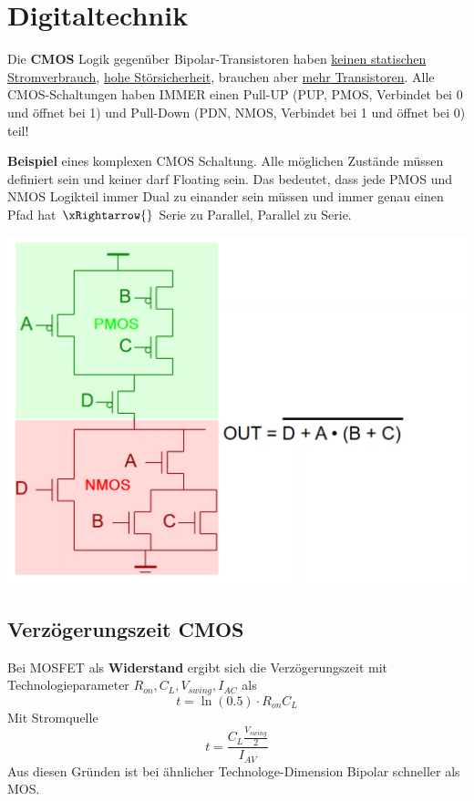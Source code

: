 \section{Digitaltechnik}
Die \textbf{CMOS} Logik gegenüber Bipolar-Transistoren haben \underline{keinen statischen Stromverbrauch}, \underline{hohe Störsicherheit}, brauchen aber \underline{mehr Transistoren}. Alle CMOS-Schaltungen haben IMMER einen Pull-UP (PUP, PMOS, Verbindet bei 0 und öffnet bei 1) und Pull-Down (PDN, NMOS, Verbindet bei 1 und öffnet bei 0) teil!

\noindent\textbf{Beispiel} eines komplexen CMOS Schaltung. Alle möglichen Zustände müssen definiert sein und keiner darf Floating sein. Das bedeutet, dass jede PMOS und NMOS Logikteil immer Dual zu einander sein müssen und immer genau einen Pfad hat $\xRightarrow{}$ Serie zu Parallel, Parallel zu Serie.
\begin{center}
	\includegraphics[width=\columnwidth]{Images/cmos}
\end{center}

\subsection{Verzögerungszeit CMOS}
Bei MOSFET als \textbf{Widerstand} ergibt sich die Verzögerungszeit mit Technologieparameter $R_{on}, C_L, V_{swing}, I_{AC}$ als
\[
t = \ln(0.5)\cdot R_{on}C_L
\]
Mit Stromquelle
\[
t = \frac{C_L \frac{V_{swing}}{2}}{I_{AV}}
\]
Aus diesen Gründen ist bei ähnlicher Technologe-Dimension Bipolar schneller als MOS.

